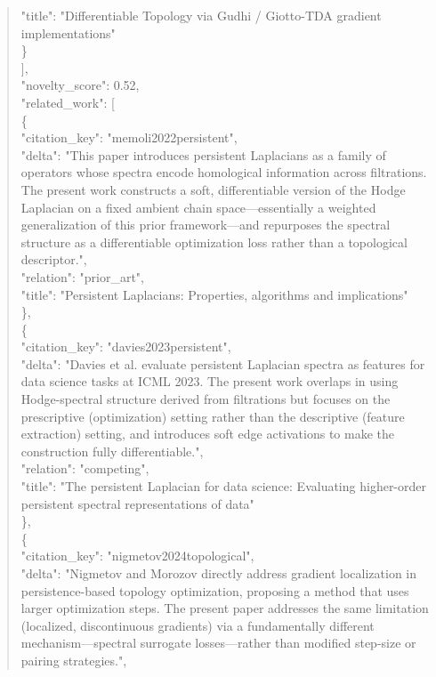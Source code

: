 \documentclass[11pt]{article}
\begin{document}
\begin{quote}
      "title": "Differentiable Topology via Gudhi / Giotto-TDA gradient implementations"\\
    \}\\
  ],\\
  "novelty\_score": 0.52,\\
  "related\_work": [\\
    \{\\
      "citation\_key": "memoli2022persistent",\\
      "delta": "This paper introduces persistent Laplacians as a family of operators whose spectra encode homological information across filtrations. The present work constructs a soft, differentiable version of the Hodge Laplacian on a fixed ambient chain space---essentially a weighted generalization of this prior framework---and repurposes the spectral structure as a differentiable optimization loss rather than a topological descriptor.",\\
      "relation": "prior\_art",\\
      "title": "Persistent Laplacians: Properties, algorithms and implications"\\
    \},\\
    \{\\
      "citation\_key": "davies2023persistent",\\
      "delta": "Davies et al. evaluate persistent Laplacian spectra as features for data science tasks at ICML 2023. The present work overlaps in using Hodge-spectral structure derived from filtrations but focuses on the prescriptive (optimization) setting rather than the descriptive (feature extraction) setting, and introduces soft edge activations to make the construction fully differentiable.",\\
      "relation": "competing",\\
      "title": "The persistent Laplacian for data science: Evaluating higher-order persistent spectral representations of data"\\
    \},\\
    \{\\
      "citation\_key": "nigmetov2024topological",\\
      "delta": "Nigmetov and Morozov directly address gradient localization in persistence-based topology optimization, proposing a method that uses larger optimization steps. The present paper addresses the same limitation (localized, discontinuous gradients) via a fundamentally different mechanism---spectral surrogate losses---rather than modified step-size or pairing strategies.",\\

\end{quote}
\end{document}
